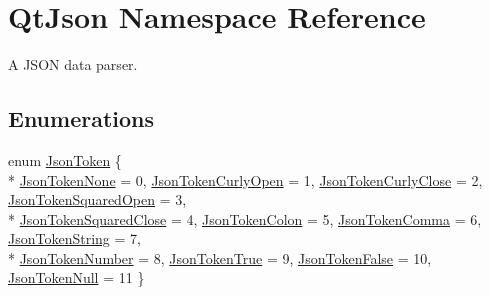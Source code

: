 \hypertarget{namespace_qt_json}{\section{Qt\-Json Namespace Reference}
\label{d2/d6d/namespace_qt_json}
}


A J\-S\-O\-N data parser.  


\subsection*{Enumerations}
\begin{DoxyCompactItemize}
\item 
enum \hyperlink{namespace_qt_json_ae6d1c0e24dd59604363a6130cbdca5d5}{Json\-Token} \{ \\*
\hyperlink{namespace_qt_json_ae6d1c0e24dd59604363a6130cbdca5d5a9e21c9aaf533f7f7d3ff3f450d6f3f48}{Json\-Token\-None} = 0, 
\hyperlink{namespace_qt_json_ae6d1c0e24dd59604363a6130cbdca5d5a367bd0ab2b0ab1036ee53dd48f0f4afa}{Json\-Token\-Curly\-Open} = 1, 
\hyperlink{namespace_qt_json_ae6d1c0e24dd59604363a6130cbdca5d5a7009219d4073e0827c8e958b54ff57f5}{Json\-Token\-Curly\-Close} = 2, 
\hyperlink{namespace_qt_json_ae6d1c0e24dd59604363a6130cbdca5d5a48d3d020e6814adb3b883e8ca5c5d3a1}{Json\-Token\-Squared\-Open} = 3, 
\\*
\hyperlink{namespace_qt_json_ae6d1c0e24dd59604363a6130cbdca5d5a6e6250ea5f55e5de97af5057c7b534ca}{Json\-Token\-Squared\-Close} = 4, 
\hyperlink{namespace_qt_json_ae6d1c0e24dd59604363a6130cbdca5d5abfb15d89c9e4acc48bce8107c23c51fe}{Json\-Token\-Colon} = 5, 
\hyperlink{namespace_qt_json_ae6d1c0e24dd59604363a6130cbdca5d5ad1c597ad17bef5dad078ea52ded0d287}{Json\-Token\-Comma} = 6, 
\hyperlink{namespace_qt_json_ae6d1c0e24dd59604363a6130cbdca5d5a1c6ed8295954a12ba80f6c2a9565829d}{Json\-Token\-String} = 7, 
\\*
\hyperlink{namespace_qt_json_ae6d1c0e24dd59604363a6130cbdca5d5a6e190b194567f0399d9c4dc8bda013eb}{Json\-Token\-Number} = 8, 
\hyperlink{namespace_qt_json_ae6d1c0e24dd59604363a6130cbdca5d5a67f8a97a5a8ed721646382e67e4d8885}{Json\-Token\-True} = 9, 
\hyperlink{namespace_qt_json_ae6d1c0e24dd59604363a6130cbdca5d5a505049fcaa83f2b410ffca0c50fb2085}{Json\-Token\-False} = 10, 
\hyperlink{namespace_qt_json_ae6d1c0e24dd59604363a6130cbdca5d5a05a0d316386867b0f7ba1f0813dbb25b}{Json\-Token\-Null} = 11
 \}
\end{DoxyCompactItemize}

